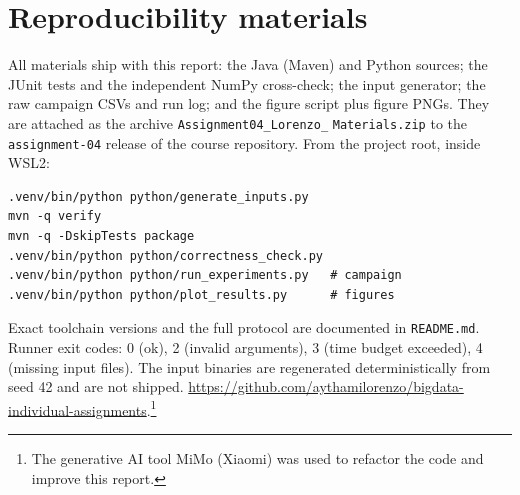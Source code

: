 \documentclass[11pt,a4paper]{article}
\begin{document}
\section{Reproducibility materials}

All materials ship with this report: the Java (Maven) and Python sources;
the JUnit tests and the independent NumPy cross-check; the input
generator; the raw campaign CSVs and run log; and the figure script plus
figure PNGs. They are attached as the archive
\texttt{Assignment04\_}\allowbreak\texttt{Lorenzo\_}\allowbreak
\texttt{Materials.zip} to the \texttt{assignment-04}
release of the course repository. From the project root, inside WSL2:

{\footnotesize
\begin{verbatim}
.venv/bin/python python/generate_inputs.py
mvn -q verify
mvn -q -DskipTests package
.venv/bin/python python/correctness_check.py
.venv/bin/python python/run_experiments.py   # campaign
.venv/bin/python python/plot_results.py      # figures
\end{verbatim}
}

Exact toolchain versions and the full protocol are documented in
\texttt{README.md}. Runner exit codes: 0 (ok), 2 (invalid arguments), 3
(time budget exceeded), 4 (missing input files). The input binaries are
regenerated deterministically from seed 42 and are not shipped.
\url{https://github.com/aythamilorenzo/bigdata-individual-assignments}.\footnote{The
generative AI tool MiMo (Xiaomi) was used to refactor the code and improve
this report.}
\end{document}
